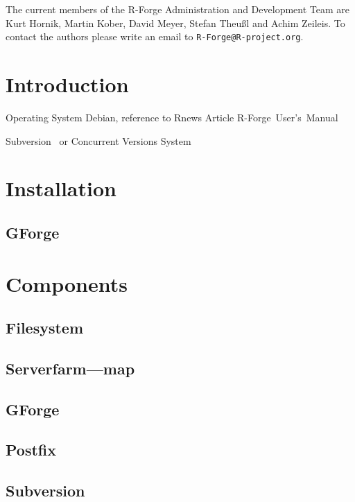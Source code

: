 \documentclass[a4paper]{article}
\newcommand{\RFORGE}{R-Forge Administration and Development Team}
\let\email=\texttt
\begin{document}
\vspace{0.5cm}
The current members of the \RFORGE{} are Kurt Hornik, Martin Kober,
David Meyer, Stefan Theu\ss{}l and Achim Zeileis. To contact the
authors please write an email to \email{R-Forge@R-project.org}.

\newpage

\pagestyle{plain}
\tableofcontents

\clearpage
\pagestyle{headings}
\setcounter{page}{1}

\section{Introduction}

Operating System Debian, reference to Rnews Article
R-Forge~User's~Manual

Subversion~\citep[SVN,
see][]{forge:Pilato+Collins-Sussman+Fitzpatrick:2004} or Concurrent
Versions System~\citep[CVS, see][]{forge:Cederqvist:2006}

\section{Installation}
\label{sec:installation}

\subsection{GForge}

\section{Components}
\label{sec:registration}

\subsection{Filesystem}
\subsection{Serverfarm---map}
\subsection{GForge}
\subsection{Postfix}
\subsection{Subversion}
\end{document}
